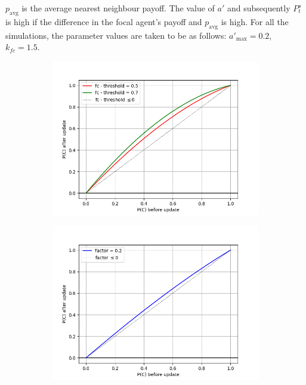 \documentclass[11pt, A4 paper, twocolumn ]{article}
\begin{document}
$ p_{\text{avg}} $ is the average nearest neighbour payoff. The value of $ a' $ and subsequently $ P_{t}^{s} $ is high if the difference in the focal agent's payoff and $ p_{\text{avg}} $ is high. For all the simulations, the parameter values are taken to be as follows: $ a'_{\text{max}} = 0.2$, $ k_{fc} = 1.5 $. 

 \begin{figure}[h]
	\centering
	\begin{subfigure}[b]{0.35\textwidth}
		\centering
		\includegraphics[width=\textwidth]{graphs/fc-threshold-probupdate}
		\caption{}
		\label{fig:fct1}
	\end{subfigure}
	\begin{subfigure}[b]{0.23\textwidth}
		\centering
		\includegraphics[width=\textwidth]{graphs/fc-threshold-probupdate-2}

\end{subfigure}
\end{figure}
\end{document}

